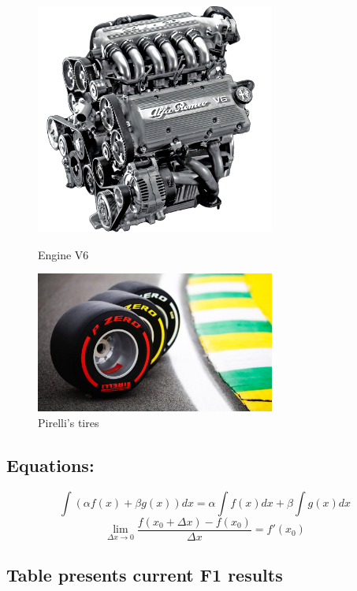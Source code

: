 \begin{figure}[h]
\begin{center}
\begin{minipage}[b]{6cm}
\centering
\includegraphics[width=0.7\textwidth]{pictures/v6.jpg} 
\caption{Engine V6}
\label{fig:silnik}
\end{minipage}
\begin{minipage}[b]{6cm}
\centering
\includegraphics[width=0.7\textwidth]{pictures/opony.jpg} 
\caption{Pirelli's tires}
\label{fig:opony}
\end{minipage}
\end{center}
\end{figure}




\subsection*{Equations:}
\begin{equation}
\label{eq:calka1}
\int (\alpha f(x) + \beta g(x)) dx = \alpha \int f(x) dx + \beta \int g(x) dx
\end{equation}
\begin{equation}
\label{eq:granica1}
\lim_{\Delta x \to 0} \frac{f(x_{0} + \Delta x) - f(x_{0})}{\Delta x} = f'(x_{0})
\end{equation}

\newpage
\subsection*{Table presents current F1 results}


